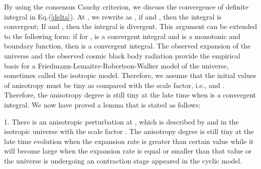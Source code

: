 \documentclass[a4paper,preprint]{revtex4}
\begin{document}
\noindent By using the consensus Cauchy criterion, we discuss the
convergence of definite integral in Eq.(\ref{delta}). At \coordHE{}, we rewrite \coordHE{} as \coordHE{}, if \coordHE{}
and \coordHE{}, then the integral is
convergent; If \coordHE{} and \coordHE{}, then
the integral is divergent. This argument can be extended to the
following form: if \coordHE{} for \coordHE{}, \coordHE{} is a convergent
integral and \coordHE{} is a monotonic and boundary function, then
\coordHE{} is a convergent
integral. The observed expansion of the universe and the observed
cosmic black body radiation provide the empirical basis for a
Friedmann-Lemaitre-Robertson-Walker model of the universe,
sometimes called the isotropic model. Therefore, we assume that
the initial values of anisotropy must be tiny as compared with the
scale factor, i.e., \coordHE{} and
\coordHE{}. Therefore,
the anisotropy degree \coordHE{} is still tiny at the late time
when \coordHE{} is a convergent integral. We now have proved a lemma that
is stated as follows:

\coordHE{} 1. There is an anisotropic perturbation at \coordHE{}, which
is described by \coordHE{} and \coordHE{} in the
isotropic universe with the scale factor \coordHE{}. The anisotropy
degree \coordHE{} is still tiny at the late time evolution when
the expansion rate is greater than certain value while it will
become large when the expansion rate is equal or smaller than that
value or the universe is undergoing an contraction stage appeared
in the cyclic model.
\end{document}
